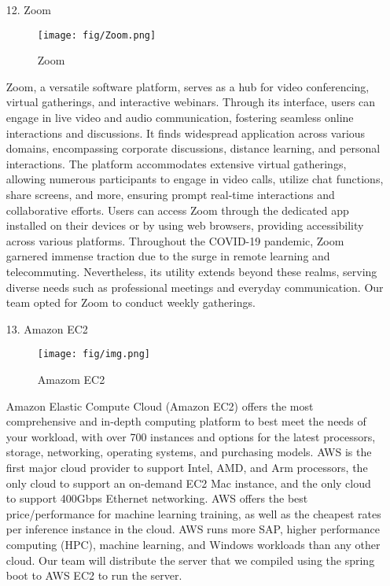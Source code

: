 \documentclass[conference]{IEEEtran}
\begin{document}
\begin{enumerate}
    \item[12.]Zoom \cite{kohnke2022facilitating}
    \begin{figure}[h]
    \centering
    \texttt{[image: fig/Zoom.png]}
    \label{fig:Zoom}
    \caption{Zoom} 
    \end{figure}
    \item[]Zoom, a versatile software platform, serves as a hub for video conferencing, virtual gatherings, and interactive webinars. Through its interface, users can engage in live video and audio communication, fostering seamless online interactions and discussions. It finds widespread application across various domains, encompassing corporate discussions, distance learning, and personal interactions. The platform accommodates extensive virtual gatherings, allowing numerous participants to engage in video calls, utilize chat functions, share screens, and more, ensuring prompt real-time interactions and collaborative efforts. Users can access Zoom through the dedicated app installed on their devices or by using web browsers, providing accessibility across various platforms. Throughout the COVID-19 pandemic, Zoom garnered immense traction due to the surge in remote learning and telecommuting. Nevertheless, its utility extends beyond these realms, serving diverse needs such as professional meetings and everyday communication. Our team opted for Zoom to conduct weekly gatherings.\\ 

    \item[13.]Amazon EC2
    \begin{figure}[h]
    \centering
    \texttt{[image: fig/img.png]}
    \label{fig:Amazon EC2}
    \caption{Amazom EC2} 
    \end{figure}
    \item[]Amazon Elastic Compute Cloud (Amazon EC2) offers the most comprehensive and in-depth computing platform to best meet the needs of your workload, with over 700 instances and options for the latest processors, storage, networking, operating systems, and purchasing models. AWS is the first major cloud provider to support Intel, AMD, and Arm processors, the only cloud to support an on-demand EC2 Mac instance, and the only cloud to support 400Gbps Ethernet networking. AWS offers the best price/performance for machine learning training, as well as the cheapest rates per inference instance in the cloud. AWS runs more SAP, higher performance computing (HPC), machine learning, and Windows workloads than any other cloud. Our team will distribute the server that we compiled using the spring boot to AWS EC2 to run the server.\\ 


\end{enumerate}
\end{document}

